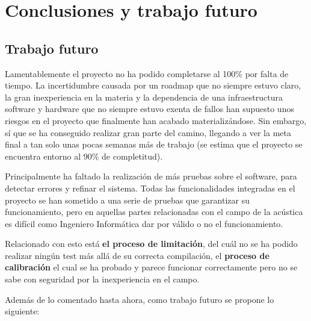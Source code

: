 \chapter{Conclusiones y trabajo futuro} \label{cap:capitulo8}

\section{Trabajo futuro}

Lamentablemente el proyecto no ha podido completarse al 100\% por falta de tiempo. La incertidumbre causada por un roadmap que no siempre estuvo claro, la gran inexperiencia en la materia y la dependencia de una infraestructura software y hardware que no siempre estuvo exenta de fallos han supuesto unos riesgos en el proyecto que finalmente han acabado materializándose. Sin embargo, sí que se ha conseguido realizar gran parte del camino, llegando a ver la meta final a tan solo unas pocas semanas más de trabajo (se estima que el proyecto se encuentra entorno al 90\% de completitud).

Principalmente ha faltado la realización de más pruebas sobre el software, para detectar errores y refinar el sistema. Todas las funcionalidades integradas en el proyecto se han sometido a una serie de pruebas que garantizar su funcionamiento, pero en aquellas partes relacionadas con el campo de la acústica es difícil como Ingeniero Informática dar por válido o no el funcionamiento.

Relacionado con esto está \textbf{el proceso de limitación}, del cuál no se ha podido realizar ningún test más allá de su correcta compilación, el \textbf{proceso de calibración} el cual se ha probado y parece funcionar correctamente pero no se sabe con seguridad por la inexperiencia en el campo.


Además de lo comentado hasta ahora, como trabajo futuro se propone lo siguiente:

